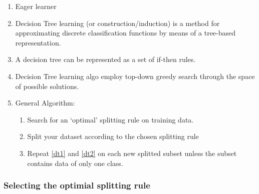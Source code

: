 \documentclass[twocolumn,landscape,10pt]{article}
\theoremstyle{definition}
\begin{document}
\begin{enumerate}
    \item Eager learner
    \item Decision Tree learning (or construction/induction) is a method for
        approximating discrete classification functions by means of a tree-based
        representation.
    \item A decision tree can be represented as a set of if-then rules.
    \item Decision Tree learning algo employ top-down greedy search through the
        space of possible solutions.
    \item General Algorithm:
        \begin{enumerate}
            \item \label{dt1}
                Search for an `optimal' splitting rule on training data.
            \item \label{dt2}
                Split your dataset according to the chosen splitting rule
            \item Repeat \ref{dt1} and \ref{dt2} on each new splitted subset
                unless the subset contains data of only one class.
        \end{enumerate} 
\end{enumerate} 

\subsubsection{Selecting the optimial splitting rule}
\end{document}
